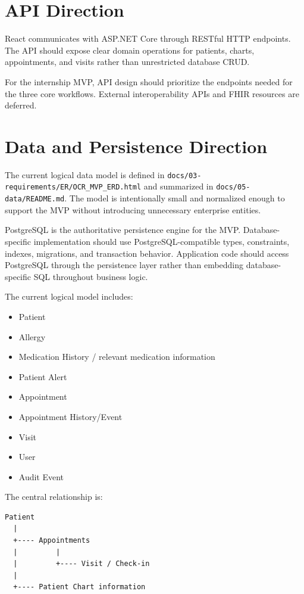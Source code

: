 \documentclass[11pt,a4paper]{article}
\begin{document}
\section{API Direction}
React communicates with ASP.NET Core through RESTful HTTP endpoints. The API should expose clear domain operations for patients, charts, appointments, and visits rather than unrestricted database CRUD.

For the internship MVP, API design should prioritize the endpoints needed for the three core workflows. External interoperability APIs and FHIR resources are deferred.

\section{Data and Persistence Direction}
The current logical data model is defined in \texttt{docs/03-requirements/ER/OCR\_MVP\_ERD.html} and summarized in \texttt{docs/05-data/README.md}. The model is intentionally small and normalized enough to support the MVP without introducing unnecessary enterprise entities.

PostgreSQL is the authoritative persistence engine for the MVP. Database-specific implementation should use PostgreSQL-compatible types, constraints, indexes, migrations, and transaction behavior. Application code should access PostgreSQL through the persistence layer rather than embedding database-specific SQL throughout business logic.

The current logical model includes:
\begin{itemize}
    \item Patient
    \item Allergy
    \item Medication History / relevant medication information
    \item Patient Alert
    \item Appointment
    \item Appointment History/Event
    \item Visit
    \item User
    \item Audit Event
\end{itemize}

The central relationship is:
\begin{verbatim}
Patient
  |
  +---- Appointments
  |         |
  |         +---- Visit / Check-in
  |
  +---- Patient Chart information
\end{verbatim}
\end{document}
